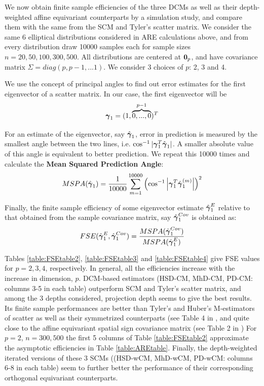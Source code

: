 \documentclass[fleqn,12pt]{article}
\begin{document}
We now obtain finite sample efficiencies of the three DCMs as well as their depth-weighted affine equivariant counterparts by a simulation study, and compare them with the same from the SCM and Tyler's scatter matrix. We consider the same 6 elliptical distributions considered in ARE calculations above, and from every distribution draw 10000 samples each for sample sizes $n = 20, 50, 100, 300, 500$. All distributions are centered at ${\bf 0}_p$, and have covariance matrix $\Sigma = diag(p,p-1,...1)$. We consider 3 choices of $p$: 2, 3 and 4.

We use the concept of principal angles \citep{miao92} to find out error estimates for the first eigenvector of a scatter matrix. In our case, the first eigenvector will be
$$ {\boldsymbol{\gamma}}_1 = (1,\overbrace{0,...,0}^{p-1})^T $$

For an estimate of the eigenvector, say $\hat{{\boldsymbol{\gamma}}}_1$, error in prediction is measured by the smallest angle between the two lines, i.e. $ \cos^{-1} | {\boldsymbol{\gamma}}_1^T \hat{{\boldsymbol{\gamma}}}_1 | $. A smaller absolute value of this angle is equivalent to better prediction. We repeat this 10000 times and calculate the \textbf{Mean Squared Prediction Angle}:
$$ MSPA(\hat {{\boldsymbol{\gamma}}}_1) = \frac{1}{10000} \sum_{m=1}^{10000} \left( \cos^{-1} \left|{\boldsymbol{\gamma}}_1^T \hat{{\boldsymbol{\gamma}}}^{(m)}_1 \right| \right)^2 $$

Finally, the finite sample efficiency of some eigenvector estimate $\hat{{\boldsymbol{\gamma}}}^E_1$ relative to that obtained from the sample covariance matrix, say $\hat{{\boldsymbol{\gamma}}}^{Cov}_1$ is obtained as:
$$ FSE(\hat{{\boldsymbol{\gamma}}}^E_1, \hat{{\boldsymbol{\gamma}}}^{Cov}_1) = \frac{MSPA(\hat{{\boldsymbol{\gamma}}}^{Cov}_1)}{MSPA(\hat{{\boldsymbol{\gamma}}}^E_1)} $$

Tables \ref{table:FSEtable2}, \ref{table:FSEtable3} and \ref{table:FSEtable4} give FSE values for $p=2,3,4$, respectively. In general, all the efficiencies increase with the increase in dimension, $p$. DCM-based estimators (HSD-CM, MhD-CM, PD-CM: columns 3-5 in each table) outperform SCM and Tyler's scatter matrix, and among the 3 depths considered, projection depth seems to give the best results. Its finite sample performances are better than Tyler's and Huber's M-estimators of scatter as well as their symmetrized counterparts (see Table 4 in \cite{sirkia07}, and quite close to the affine equivariant spatial sign covariance matrix (see Table 2 in \cite{ollilia03}) For $p=2$, $n=300, 500$ the first 5 columns of Table \ref{table:FSEtable2} approximate the asymptotic efficiencies in Table \ref{table:AREtable}. Finally, the depth-weighted iterated versions of these 3 SCMs ((HSD-wCM, MhD-wCM, PD-wCM: columns 6-8 in each table) seem to further better the performance of their corresponding orthogonal equivariant counterparts.
\end{document}
